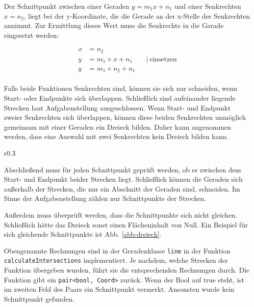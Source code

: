 Der Schnittpunkt zwischen einer Geraden \(y=m_1x+n_1\) und einer Senkrechten \(x=n_2\),
liegt bei der y-Koordinate, die die Gerade an der x-Stelle der Senkrechten annimmt.
Zur Ermittlung dieses Wert muss die Senkrechte in die Gerade eingesetzt werden:

\begin{equation}
    \begin{aligned}
        x &= n_2                    \\
        y &= m_1 \times x + n_1 \qquad\vert\ \text{einsetzen}  \\
        y &= m_1 \times n_2 + n_1   \\
    \end{aligned}
    \label{eq:senkrechtschnitt}
\end{equation}

Falls beide Funktionen Senkrechten sind, können sie sich nur schneiden,
wenn Start- oder Endpunkte sich überlappen.
Schließlich sind aufeinander liegende Strecken laut Aufgabenstellung ausgeschlossen.
Wenn Start- und Endpunkt zweier Senkrechten sich überlappen,
können diese beiden Senkrechten unmöglich gemeinsam mit einer Geraden
ein Dreieck bilden. Daher kann angenommen werden, dass eine Auswahl mit zwei Senkrechten
kein Dreieck bilden kann.

\begin{wrapfigure}{r}{0.3\textwidth}
    \begin{center}
    
    \end{center}
    \caption{Dreieck mit der Flächengröße 0}
    \label{abb:dreieck}
\end{wrapfigure}
Abschließend muss für jeden Schnittpunkt geprüft werden,
ob er zwischen dem Start- und Endpunkt beider Strecken liegt.
Schließlich können die Geraden sich außerhalb der Strecken,
die nur ein Abschnitt der Geraden sind, schneiden.
Im Sinne der Aufgabenstellung zählen nur Schnittpunkte der Strecken.

Außerdem muss überprüft werden, dass die Schnittpunkte sich nicht gleichen.
Schließlich hätte das Dreieck sonst einen Flächeninhalt von Null.
Ein Beispiel für sich gleichende Schnittpunkte ist Abb. \ref{abb:dreieck}.

Obengenannte Rechnungen sind in der Geradenklasse \texttt{line} in der Funktion
\texttt{calculateIntersections} implementiert.
Je nachdem, welche Strecken der Funktion übergeben wurden,
führt sie die entsprechenden Rechnungen durch.
Die Funktion gibt ein \texttt{pair<bool, Coord>} zurück.
Wenn der Bool auf true steht,
ist im zweiten Feld des Paars ein Schnittpunkt vermerkt.
Ansonsten wurde kein Schnittpunkt gefunden.

